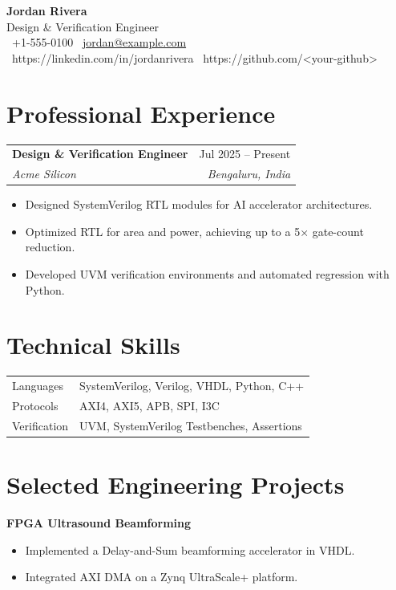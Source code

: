 \documentclass[10pt,letterpaper]{article}
\newcommand{\resumeSubheading}[4]{
\begin{tabularx}{\textwidth}{Xr}
\textbf{#1} & #2\\
\textit{#3} & \textit{#4}
\end{tabularx}
}
\begin{document}
\begin{center}
{\LARGE \textbf{Jordan Rivera}}\\[4pt]
{\large Design \& Verification Engineer}\\[6pt]
\faPhone\ +1-555-0100 \quad
\faEnvelope\ \href{mailto:jordan@example.com}{jordan@example.com}\\
\faLinkedin\ https://linkedin.com/in/jordanrivera \quad
\faGithub\ https://github.com/<your-github>
\end{center}

\section*{Professional Experience}

\resumeSubheading
{Design \& Verification Engineer}{Jul 2025 -- Present}
{Acme Silicon}{Bengaluru, India}

\begin{itemize}[leftmargin=*]
\item Designed SystemVerilog RTL modules for AI accelerator architectures.
\item Optimized RTL for area and power, achieving up to a 5$\times$ gate-count reduction.
\item Developed UVM verification environments and automated regression with Python.
\end{itemize}

\section*{Technical Skills}

\begin{tabular}{p{1.6in}p{4.8in}}
Languages & SystemVerilog, Verilog, VHDL, Python, C++\\
Protocols & AXI4, AXI5, APB, SPI, I3C\\
Verification & UVM, SystemVerilog Testbenches, Assertions\\
\end{tabular}

\section*{Selected Engineering Projects}

\textbf{FPGA Ultrasound Beamforming}

\begin{itemize}[leftmargin=*]
\item Implemented a Delay-and-Sum beamforming accelerator in VHDL.
\item Integrated AXI DMA on a Zynq UltraScale+ platform.
\end{itemize}
\end{document}
